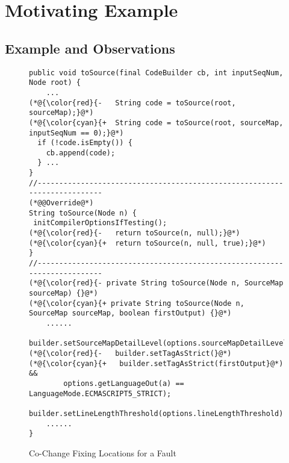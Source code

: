 \section{Motivating Example}
\label{motiv:section}

\subsection{Example and Observations}

\begin{figure}[t]
	\centering
	\begin{lstlisting}[]
public void toSource(final CodeBuilder cb, int inputSeqNum, Node root) {
	...
(*@{\color{red}{-	String code = toSource(root, sourceMap);}@*)
(*@{\color{cyan}{+	String code = toSource(root, sourceMap, inputSeqNum == 0);}@*)
  if (!code.isEmpty()) {
    cb.append(code);
  } ...
}
//--------------------------------------------------------------------------
(*@@Override@*)
String toSource(Node n) {
 initCompilerOptionsIfTesting();
(*@{\color{red}{-	return toSource(n, null);}@*)
(*@{\color{cyan}{+ 	return toSource(n, null, true);}@*)
}
//--------------------------------------------------------------------------
(*@{\color{red}{- private String toSource(Node n, SourceMap sourceMap) {}@*)
(*@{\color{cyan}{+ private String toSource(Node n, SourceMap sourceMap, boolean firstOutput) {}@*)
	......
  builder.setSourceMapDetailLevel(options.sourceMapDetailLevel);
(*@{\color{red}{-   builder.setTagAsStrict(}@*)
(*@{\color{cyan}{+   builder.setTagAsStrict(firstOutput}@*) && 
		options.getLanguageOut(a) == LanguageMode.ECMASCRIPT5_STRICT);
  builder.setLineLengthThreshold(options.lineLengthThreshold);
	......	
}	
	\end{lstlisting}
        \vspace{-15pt}
        \caption{Co-Change Fixing Locations for a Fault}
        \vspace{-6pt}
        \label{fig:motiv}
\end{figure}

